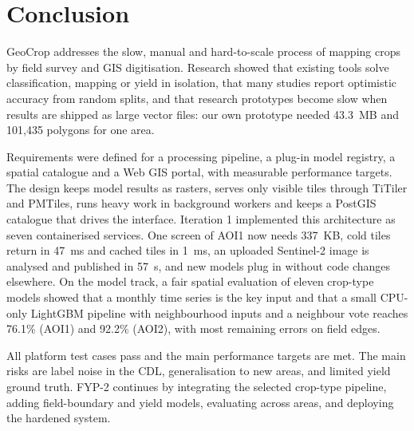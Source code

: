 \chapter{Conclusion}
GeoCrop addresses the slow, manual and hard-to-scale process of mapping crops by field survey and
GIS digitisation. Research showed that existing tools solve classification, mapping or yield in
isolation, that many studies report optimistic accuracy from random splits, and that research
prototypes become slow when results are shipped as large vector files: our own prototype needed
43.3~MB and 101,435 polygons for one area.

Requirements were defined for a processing pipeline, a plug-in model registry, a spatial catalogue
and a Web GIS portal, with measurable performance targets. The design keeps model results as rasters,
serves only visible tiles through TiTiler and PMTiles, runs heavy work in background workers and
keeps a PostGIS catalogue that drives the interface. Iteration 1 implemented this architecture as
seven containerised services. One screen of AOI1 now needs 337~KB, cold tiles return in 47~ms and
cached tiles in 1~ms, an uploaded Sentinel-2 image is analysed and published in 57~s, and new models
plug in without code changes elsewhere. On the model track, a fair spatial evaluation of eleven
crop-type models showed that a monthly time series is the key input and that a small CPU-only
LightGBM pipeline with neighbourhood inputs and a neighbour vote reaches 76.1\% (AOI1) and 92.2\%
(AOI2), with most remaining errors on field edges.

All platform test cases pass and the main performance targets are met. The main risks are label
noise in the CDL, generalisation to new areas, and limited yield ground truth. FYP-2 continues by
integrating the selected crop-type pipeline, adding field-boundary and yield models, evaluating across
areas, and deploying the hardened system.
